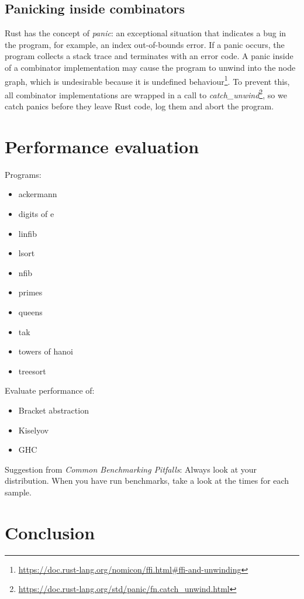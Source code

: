 \documentclass[conference]{IEEEtran}
\begin{document}
\subsection{Panicking inside combinators}
Rust has the concept of \emph{panic}: an exceptional situation that indicates a bug in the program, for example, an index out-of-bounds error.
If a panic occurs, the program collects a stack trace and terminates with an error code.
A panic inside of a combinator implementation may cause the program to unwind into the node graph, which is undesirable because it is undefined behaviour\footnote{\url{https://doc.rust-lang.org/nomicon/ffi.html\#ffi-and-unwinding}}.
To prevent this, all combinator implementations are wrapped in a call to \emph{catch\_unwind}\footnote{\url{https://doc.rust-lang.org/std/panic/fn.catch_unwind.html}}, so we catch panics before they leave Rust code, log them and abort the program.

\section{Performance evaluation}
\label{sec:eval}
Programs:
\begin{itemize}
    \item ackermann
    \item digits of e
    \item linfib
    \item lsort
    \item nfib
    \item primes
    \item queens
    \item tak
    \item towers of hanoi
    \item treesort
\end{itemize}

Evaluate performance of:

\begin{itemize}
    \item Bracket abstraction
    \item Kiselyov
    \item GHC
\end{itemize}

Suggestion from \textit{Common Benchmarking Pitfalls}: Always look at your distribution.
When you have run benchmarks, take a look at the times for each sample.

\section{Conclusion}
\end{document}
